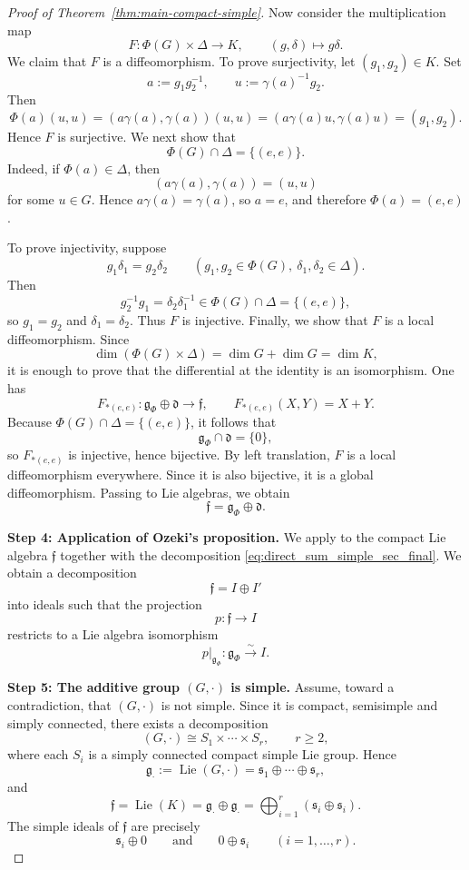 \documentclass[reqno]{amsart}
\DeclareMathOperator{\Lie}{Lie}
\begin{document}
\begin{proof}[Proof of Theorem~\ref{thm:main-compact-simple}]
Now consider the multiplication map
\[
F:\Phi(G)\times \Delta\longrightarrow K,
\qquad
(g,\delta)\longmapsto g\delta.
\]
We claim that \(F\) is a diffeomorphism.
To prove surjectivity, let \((g_1,g_2)\in K\). Set
\[
a:=g_1g_2^{-1},
\qquad
u:=\gamma(a)^{-1}g_2.
\]
Then
\[
\Phi(a)(u,u)
=
(a\gamma(a),\gamma(a))(u,u)
=
(a\gamma(a)u,\gamma(a)u)
=
(g_1,g_2).
\]
Hence \(F\) is surjective.
We next show that
\[
\Phi(G)\cap \Delta=\{(e,e)\}.
\]
Indeed, if \(\Phi(a)\in\Delta\), then
\[
(a\gamma(a),\gamma(a))=(u,u)
\]
for some \(u\in G\). Hence \(a\gamma(a)=\gamma(a)\), so \(a=e\), and therefore
\(\Phi(a)=(e,e)\).

To prove injectivity, suppose
\[
g_1\delta_1=g_2\delta_2
\qquad
(g_1,g_2\in \Phi(G),\ \delta_1,\delta_2\in \Delta).
\]
Then
\[
g_2^{-1}g_1=\delta_2\delta_1^{-1}\in \Phi(G)\cap \Delta=\{(e,e)\},
\]
so \(g_1=g_2\) and \(\delta_1=\delta_2\). Thus \(F\) is injective.
Finally, we show that \(F\) is a local diffeomorphism. Since
\[
\dim(\Phi(G)\times \Delta)=\dim G+\dim G=\dim K,
\]
it is enough to prove that the differential at the identity is an isomorphism.
One has
\[
F_{*(e,e)}:\mathfrak g_\Phi\oplus \mathfrak d\to \mathfrak f,
\qquad
F_{*(e,e)}(X,Y)=X+Y.
\]
Because \(\Phi(G)\cap \Delta=\{(e,e)\}\), it follows that
\[
\mathfrak g_\Phi\cap \mathfrak d=\{0\},
\]
so \(F_{*(e,e)}\) is injective, hence bijective. By left translation, \(F\) is
a local diffeomorphism everywhere. Since it is also bijective, it is a global
diffeomorphism. Passing to Lie algebras, we obtain
\begin{equation}\label{eq:direct_sum_simple_sec_final}
\mathfrak f=\mathfrak g_\Phi\oplus \mathfrak d.
\end{equation}


\medskip
\noindent
\textbf{Step 4: Application of Ozeki's proposition.}
We apply \cite[Proposition~1]{Ozeki1977} to the compact Lie algebra
\(\mathfrak f\) together with the decomposition
\eqref{eq:direct_sum_simple_sec_final}. We obtain a decomposition
\[
\mathfrak f=I\oplus I'
\]
into ideals such that the projection
\[
p:\mathfrak f\to I
\]
restricts to a Lie algebra isomorphism
\begin{equation}\label{eq:p_iso_simple_sec_final}
p|_{\mathfrak g_\Phi}:\mathfrak g_\Phi\xrightarrow{\sim} I.
\end{equation}

\medskip
\noindent
\textbf{Step 5: The additive group \((G,\cdot)\) is simple.}
Assume, toward a contradiction, that \((G,\cdot)\) is not simple. Since it is
compact, semisimple and simply connected, there exists a decomposition
\[
(G,\cdot)\cong S_1\times \cdots \times S_r,
\qquad r\ge 2,
\]
where each \(S_i\) is a simply connected compact simple Lie group. Hence
\[
\mathfrak g_{\cdot}:=\Lie(G,\cdot)
=
\mathfrak s_1\oplus\cdots\oplus \mathfrak s_r,
\]
and
\[
\mathfrak f=\Lie(K)
=
\mathfrak g_{\cdot}\oplus \mathfrak g_{\cdot}
=
\bigoplus_{i=1}^r (\mathfrak s_i\oplus \mathfrak s_i).
\]
The simple ideals of \(\mathfrak f\) are precisely
\[
\mathfrak s_i\oplus 0
\qquad\text{and}\qquad
0\oplus \mathfrak s_i
\qquad (i=1,\dots,r).
\]


\end{proof}
\end{document}
